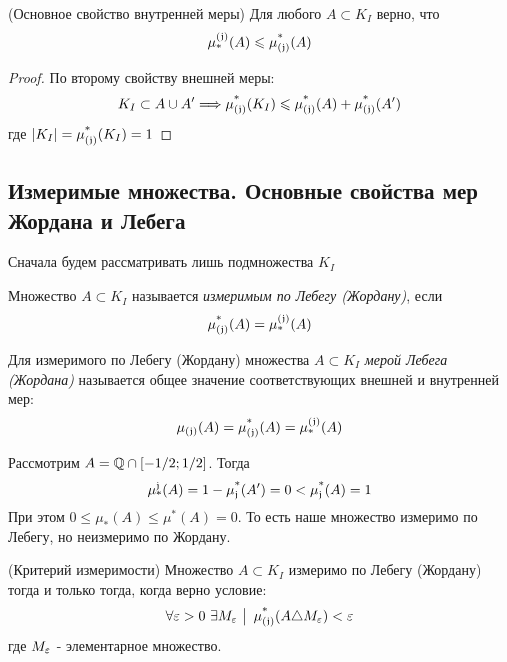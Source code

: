 \begin{theorem} (Основное свойство внутренней меры)
	Для любого $A \subset K_I$ верно, что
	\[
		\operatorname{\mu^{(\mathfrak{j})}_*}(A) \leqslant \operatorname{\mu^*_{(\mathfrak{j})}}(A)
	\]
\end{theorem}

\begin{proof}
	По второму свойству внешней меры:
	\[
		K_I \subset A \cup A' \Longrightarrow \operatorname{\mu^*_{(\mathfrak{j})}}(K_I) \leqslant \operatorname{\mu^*_{(\mathfrak{j})}}(A) + \operatorname{\mu^*_{(\mathfrak{j})}}(A')
	\]
	где $|K_I| = \operatorname{\mu^*_{(\mathfrak{j})}}(K_I) = 1$
\end{proof}

\subsection{Измеримые множества. Основные свойства мер Жордана и Лебега}

\begin{note}
	Сначала будем рассматривать лишь подмножества $K_I$
\end{note}

\begin{definition}
	Множество $A \subset K_I$ называется \textit{измеримым по Лебегу (Жордану)}, если
	\[
		\operatorname{\mu^*_{(\mathfrak{j})}}(A) = \operatorname{\mu^{(\mathfrak{j})}_*}(A)
	\]
\end{definition}

\begin{definition}
	Для измеримого по Лебегу (Жордану) множества $A \subset K_I$ \textit{мерой Лебега (Жордана)} называется общее значение соответствующих внешней и внутренней мер:
	\[
		\operatorname{\mu_{(\mathfrak{j})}}(A) = \operatorname{\mu^*_{(\mathfrak{j})}}(A) = \operatorname{\mu^{(\mathfrak{j})}_*}(A)
	\]
\end{definition}

\begin{example}
	Рассмотрим $A = \mathbb{Q} \cap [-1/2; 1/2]$. Тогда
	\[
		\operatorname{\mu^\mathfrak{j}_*}(A) = 1 - \operatorname{\mu^*_\mathfrak{j}}(A') = 0 < \operatorname{\mu^*_\mathfrak{j}}(A) = 1
	\]
	При этом $0 \le \mu_*(A) \le \mu^*(A) = 0$. То есть наше множество измеримо по Лебегу, но неизмеримо по Жордану.
\end{example}

\begin{theorem} (Критерий измеримости)
	Множество $A \subset K_I$ измеримо по Лебегу (Жордану) тогда и только тогда, когда верно условие:
	\[
		\forall \varepsilon > 0\ \exists M_\varepsilon \ \big|\  \operatorname{\mu^*_{(\mathfrak{j})}}(A \triangle M_\varepsilon) < \varepsilon
	\]
	где $M_\varepsilon$ - элементарное множество.
\end{theorem}

